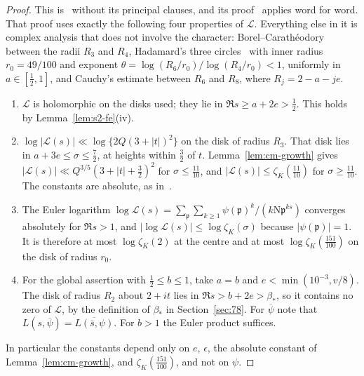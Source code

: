 \documentclass[11pt]{article}
\numberwithin{equation}{section}
\newcommand{\N}{\mathrm N}
\begin{document}
\begin{proof}
This is~\cite[Lemma~4.9]{OAI78} without its principal clauses, and its
proof~\cite[proof of Lemma~4.9]{OAI78} applies word for word. That proof uses exactly the following four properties
of $\mathcal L$. Everything else in it is complex analysis that does not involve the character:
Borel--Carath\'eodory~\cite[\S5.5]{Tit39} between the radii $R_3$ and $R_4$, Hadamard's three circles~\cite[\S5.3]{Tit39} with inner radius $r_0=49/100$
and exponent $\theta=\log(R_6/r_0)/\log(R_4/r_0)<1$, uniformly in $a\in[\frac12,1]$, and Cauchy's estimate between
$R_6$ and $R_8$, where $R_j=2-a-je$.
\begin{enumerate}
\item $\mathcal L$ is holomorphic on the disks used; they lie in $\Re s\ge a+2e>\frac12$. This holds by
 Lemma~\ref{lem:s2-fe}(iv).
\item $\log|\mathcal L(s)|\ll\log\{2Q(3+|t|)^2\}$ on the disk of radius $R_3$. That disk lies in
 $a+3e\le\sigma\le\frac72$, at heights within $\frac32$ of $t$. Lemma~\ref{lem:cm-growth} gives
 $|\mathcal L(s)|\ll Q^{3/5}(3+|t|+\frac32)^2$ for $\sigma\le\frac{11}{10}$, and
 $|\mathcal L(s)|\le\zeta_K(\frac{11}{10})$ for $\sigma\ge\frac{11}{10}$. The constants are absolute, as
 in~\cite[proof of Lemma~4.9]{OAI78}.
\item The Euler logarithm
 $\log\mathcal L(s)=\sum_{\mathfrak p}\sum_{k\ge1}\psi(\mathfrak p)^k/(k\N\mathfrak p^{ks})$ converges absolutely
 for $\Re s>1$, and $|\log\mathcal L(s)|\le\log\zeta_K(\sigma)$ because $|\psi(\mathfrak p)|=1$. It is therefore
 at most $\log\zeta_K(2)$ at the centre and at most $\log\zeta_K(\frac{151}{100})$ on the disk of radius $r_0$.
\item For the global assertion with $\frac12\le b\le1$, take $a=b$ and $e<\min(10^{-3},v/8)$. The disk of
 radius $R_2$ about $2+it$ lies in $\Re s>b+2e>\beta_*$, so it contains no zero of $\mathcal L$, by the
 definition of $\beta_*$ in Section~\ref{sec:78}. For $\overline\psi$ note that $L(s,\overline\psi)=\overline{L(\bar s,\psi)}$.
 For $b>1$ the Euler product suffices.
\end{enumerate}
In particular the constants depend only on $e$, $\epsilon$, the absolute constant of Lemma~\ref{lem:cm-growth},
and $\zeta_K(\frac{151}{100})$, and not on $\psi$.
\end{proof}
\end{document}

